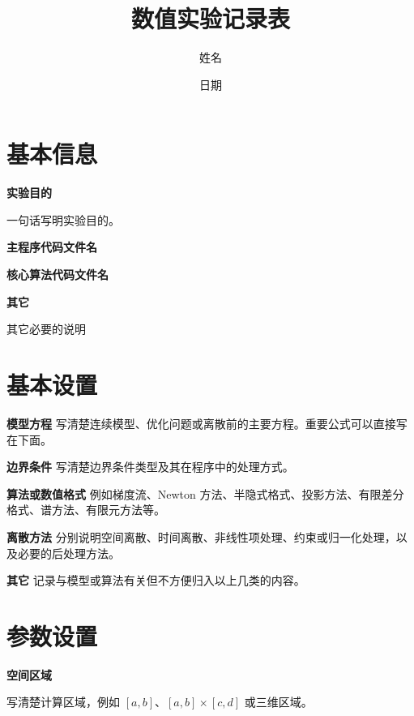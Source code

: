 \documentclass[UTF8,a4paper,11pt]{ctexart}
\title{\textbf{数值实验记录表}}
\author{姓名} %
\date{日期} %
\newcommand{\hint}[1]{{\small\color{midgray}#1}\par}
\begin{document}
\maketitle

\section{基本信息}
\noindent\textbf{实验目的}\par \hint{一句话写明实验目的。}
\vspace{1.0em}
\noindent\textbf{主程序代码文件名}\par 
\vspace{1.0em}
\noindent\textbf{核心算法代码文件名}\par
\vspace{1.0em}
\noindent\textbf{其它}\par \hint{其它必要的说明}
\vspace{1.0em}



\section{基本设置}

\noindent\textbf{模型方程}
\hint{写清楚连续模型、优化问题或离散前的主要方程。重要公式可以直接写在下面。}
\vspace{1.0em}

\noindent\textbf{边界条件}
\hint{写清楚边界条件类型及其在程序中的处理方式。}
\vspace{1.0em}

\noindent\textbf{算法或数值格式}
\hint{例如梯度流、Newton 方法、半隐式格式、投影方法、有限差分格式、谱方法、有限元方法等。}
\vspace{1.0em}

\noindent\textbf{离散方法}
\hint{分别说明空间离散、时间离散、非线性项处理、约束或归一化处理，以及必要的后处理方法。}
\vspace{1.0em}

\noindent\textbf{其它}
\hint{记录与模型或算法有关但不方便归入以上几类的内容。}
\vspace{1.0em}


\section{参数设置}

\noindent\textbf{空间区域}\par
\hint{写清楚计算区域，例如 $[a,b]$、$[a,b]\times[c,d]$ 或三维区域。}
\vspace{1.0em}
\end{document}
